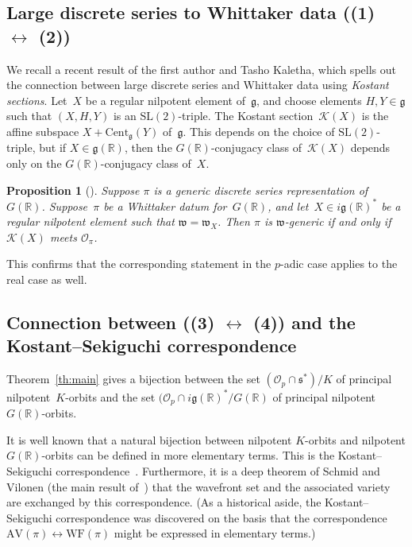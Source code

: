 \documentclass[10pt,leqno]{article}
\newtheorem{proposition}[equation]{Proposition}
\renewcommand{\O}{\mathcal O}
\newcommand{\R}{\mathbb R}
\newcommand{\g}{\mathfrak g}
\newcommand{\SL}{\text{SL}}
\newcommand{\s}{\mathfrak s}
\newcommand{\w}{\mathfrak w}
\newcommand{\AV}{\mathrm{AV}}
\newcommand{\WF}{\mathrm{WF}}
\newcommand{\Op}{\O_p}
\newcommand{\Kostant}[1]{\mathcal{K}(#1)}
\begin{document}
\subsection{Large discrete series to Whittaker data ((1) $\leftrightarrow$ (2))}


We recall a recent result of the first author and Tasho Kaletha, which spells out the connection between large discrete series and Whittaker data using  {\it Kostant sections}. Let~$X$ be a regular nilpotent element of~$\g$, and choose elements $H, Y \in \g$ such that $(X,H,Y)$ is an  $\SL(2)$-triple. The Kostant section~$\Kostant{X}$ is the affine subspace $X + \mathrm{Cent}_{\g}(Y)$ of~$\g$. This depends on the choice of $\SL(2)$-triple, but if $X \in \g(\R)$, then the $G(\R)$-conjugacy class of~$\Kostant{X}$ depends only on the $G(\R)$-conjugacy class of~$X$. 


\begin{proposition}[\cite{adams_kaletha}]\label{JeffTasho_criterion}
Suppose $\pi$ is a generic discrete series representation of~$G(\R)$. Suppose~$\pi$ be a Whittaker datum for~$G(\R)$, and let~$X \in i\g(\R)^*$ be a regular nilpotent element such that $\w = \w_X$. 
Then $\pi$ is $\w$-generic if and only if $\Kostant{X}$ meets $\mathcal{O}_\pi$. 
\end{proposition}


This confirms that  the corresponding statement  in the $p$-adic case \cite{debacker_reeder_generic, kaletha_epipelagic}
applies to the real case as well.


\subsection{Connection between ((3) $\leftrightarrow$ (4)) and the Kostant--Sekiguchi correspondence } 

Theorem~\ref{th:main} gives a bijection between the set $(\Op \cap \s^*)/K$ of principal nilpotent~$K$-orbits and the set $(\Op \cap i\g(\R)^*/G(\R)$ of principal nilpotent~$G(\R)$-orbits. 

It is well known that a natural bijection between nilpotent $K$-orbits and nilpotent $G(\R)$-orbits can be defined in more elementary terms. This is the Kostant--Sekiguchi correspondence~\cite{sekiguchi}. Furthermore, it is a deep theorem of Schmid and Vilonen (the main result of~\cite{SV1}) that the wavefront set and the associated variety are exchanged by this correspondence. (As a historical aside, the Kostant--Sekiguchi correspondence was discovered on the basis that the correspondence $\AV(\pi) \leftrightarrow \WF(\pi)$ might be expressed in elementary terms.)
\end{document}

